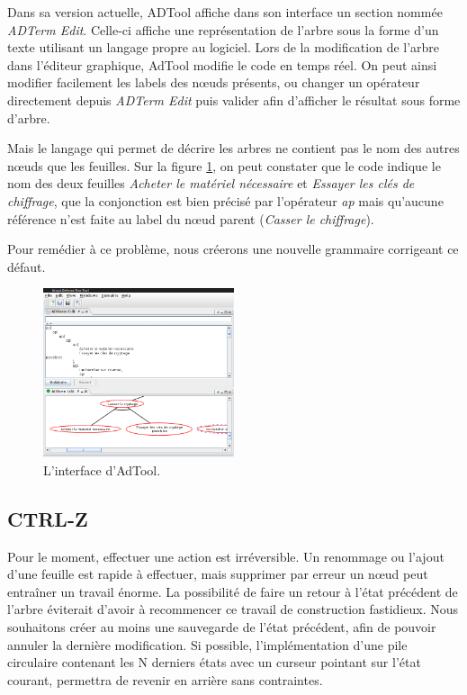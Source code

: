 	Dans sa version actuelle, ADTool affiche dans son interface un section nommée \emph{ADTerm Edit}. Celle-ci affiche une représentation de l'arbre sous la forme d'un texte utilisant un langage propre au logiciel. Lors de la modification de l'arbre dans l'éditeur graphique, AdTool modifie le code en temps réel. On peut ainsi modifier facilement les labels des nœuds présents, ou changer un opérateur directement depuis \emph{ADTerm Edit} puis valider afin d'afficher le résultat sous forme d'arbre.

	Mais le langage qui permet de décrire les arbres ne contient pas le nom des autres nœuds que les feuilles. Sur la figure \ref{fig:int_adTool}, on peut constater que le code indique le nom des deux feuilles \textit{Acheter le matériel nécessaire} et \textit{Essayer les clés de chiffrage}, que la conjonction est bien précisé par l'opérateur \textit{ap} mais qu'aucune référence n'est faite au label du nœud parent (\textit{Casser le chiffrage}).

	Pour remédier à ce problème, nous créerons une nouvelle grammaire corrigeant ce défaut.



	\begin{figure}
		\centering
		\includegraphics[width=0.5\textwidth]{figure/interface_adtool.png}
		\caption{L'interface d'AdTool.}
		\label{fig:int_adTool}
	\end{figure}
	
	\subsection{CTRL-Z}
	Pour le moment, effectuer une action est irréversible. Un renommage ou l'ajout d'une feuille est rapide à effectuer, mais supprimer par erreur un nœud peut entraîner un travail énorme. La possibilité de faire un retour à l'état précédent de l'arbre éviterait d'avoir à recommencer ce travail de construction fastidieux. Nous souhaitons créer au moins une sauvegarde de l'état précédent, afin de pouvoir annuler la dernière modification. Si possible, l'implémentation d'une pile circulaire contenant les N derniers états avec un curseur pointant sur l'état courant, permettra de revenir en arrière sans contraintes.
	
